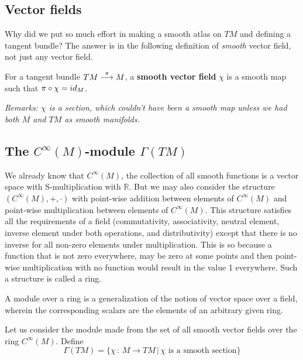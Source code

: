 \subsection{Vector fields}
Why did we put so much effort in making a smooth atlas on $TM$ and defining a tangent bundle? The answer is in the following definition of \emph{smooth} vector field, not just any vector field.

\begin{definition}
For a tangent bundle $TM \stackrel{\pi}{\longrightarrow} M$, a \textbf{smooth vector field} $\chi$ is a smooth map such that $\pi \circ \chi = id_{M}$.
\end{definition}


\textit{Remarks: $\chi$ is a section, which couldn't have been a smooth map unless we had both $M$ and $TM$ as smooth manifolds.}

\subsection{The $C^{\infty}(M)$-module $\Gamma(TM)$}
We already know that $C^{\infty}(M)$, the collection of all smooth functions is a vector space with S-multiplication with $\mathbb{R}$. But we may also consider the structure $(C^{\infty}(M),+,\cdot)$ with point-wise addition between elements of $C^{\infty}(M)$ and point-wise multiplication between elements of $C^{\infty}(M)$. This structure satisfies all the requirements of a field (commutativity, associativity, neutral element, inverse element under both operations, and distributivity) except that there is no inverse for all non-zero elements under multiplication. This is so because a function that is not zero everywhere, may be zero at some points and then point-wise multiplication with no function would result in the value 1 everywhere. Such a structure is called a ring. 

A module over a ring is a generalization of the notion of vector space over a field, wherein the corresponding scalars are the elements of an arbitrary given ring.

Let us consider the module made from the set of all smooth vector fields over the ring $C^{\infty}(M)$. Define \\
\begin{equation}
\Gamma(TM) = \lbrace \chi \, : \, M \to TM \, | \, \chi \text{ is a smooth section} \rbrace
\end{equation}

